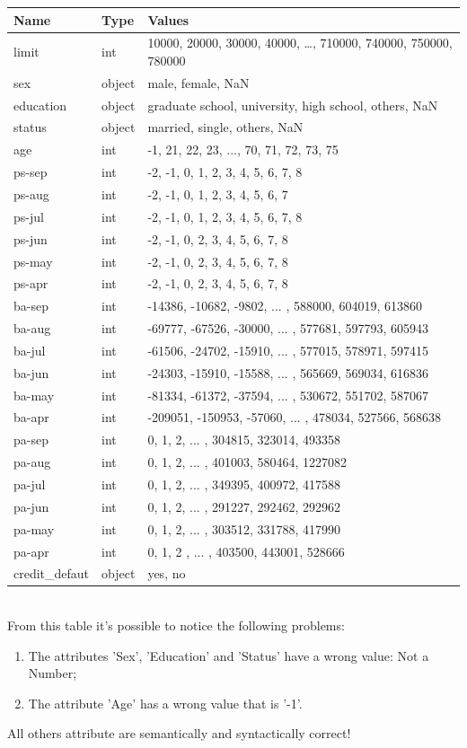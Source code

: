 \documentclass[a4paper]{article}
\begin{document}
\begin{tabular}{ l | l | l }
\hline
Name & Type & Values\\\hline
limit & int & 10000, 20000,  30000,  40000, \dots,   710000, 740000, 750000, 780000 \\
sex & object & male, female, NaN \\
education  & object & graduate school, university, high school, others, NaN \\
status & object & married, single, others, NaN \\
age & int &  -1, 21, 22, 23, ..., 70, 71, 72, 73, 75 \\
ps-sep & int &  -2, -1,  0,  1,  2,  3,  4,  5,  6,  7,  8 \\
ps-aug & int &  -2, -1,  0,  1,  2,  3,  4,  5,  6,  7 \\
ps-jul & int &  -2, -1,  0, 1,  2,  3,  4,  5,  6,  7,  8 \\
ps-jun & int &  -2, -1,  0,  2,  3,  4,  5,  6,  7,  8 \\
ps-may & int &  -2, -1,  0,  2,  3,  4,  5,  6,  7,  8 \\
ps-apr  & int &  -2, -1,  0,  2,  3,  4,  5,  6,  7,  8 \\
ba-sep & int &  -14386, -10682,  -9802,  ... , 588000, 604019, 613860 \\
ba-aug & int &  -69777, -67526, -30000, ... , 577681, 597793, 605943 \\
ba-jul & int &  -61506, -24702, -15910, ... , 577015, 578971, 597415 \\
ba-jun & int &  -24303, -15910, -15588, ... , 565669, 569034, 616836 \\
ba-may & int &  -81334, -61372, -37594, ... , 530672, 551702, 587067 \\
ba-apr & int &  -209051, -150953,  -57060, ... ,  478034,  527566,  568638 \\
pa-sep & int &   0, 1, 2, ... , 304815, 323014, 493358 \\
pa-aug & int &   0, 1, 2, ... , 401003,  580464, 1227082 \\
pa-jul & int &   0, 1, 2, ... , 349395, 400972, 417588 \\
pa-jun & int &   0, 1, 2, ... , 291227, 292462, 292962 \\
pa-may & int &  0, 1, 2, ... , 303512, 331788, 417990 \\
pa-apr & int &   0, 1, 2 , ... , 403500, 443001, 528666 \\
credit\_defaut & object &  yes, no \\
\hline
\end{tabular}\bigskip\\	
From this table it's possible to notice the following problems:
\begin{enumerate}
\item The attributes 'Sex', 'Education' and 'Status' have a wrong value: Not a Number;
\item The attribute 'Age' has a wrong value that is '-1'.
\end{enumerate}
All others attribute are semantically and syntactically correct!

	
    
    
    















\end{document}
